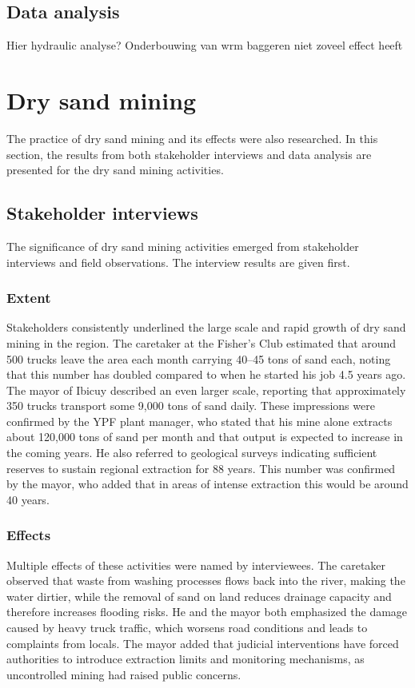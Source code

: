 \subsection{Data analysis}
Hier hydraulic analyse?
Onderbouwing van wrm baggeren niet zoveel effect heeft

\section{Dry sand mining}
The practice of dry sand mining and its effects were also researched. In this section, the results from both stakeholder interviews and data analysis are presented for the dry sand mining activities. 
\subsection{Stakeholder interviews}
The significance of dry sand mining activities emerged from stakeholder interviews and field observations. The interview results are given first.
\subsubsection{Extent}
Stakeholders consistently underlined the large scale and rapid growth of dry sand mining in the region. The caretaker at the Fisher’s Club estimated that around 500 trucks leave the area each month carrying 40–45 tons of sand each, noting that this number has doubled compared to when he started his job 4.5 years ago. The mayor of Ibicuy described an even larger scale, reporting that approximately 350 trucks transport some 9,000 tons of sand daily. These impressions were confirmed by the YPF plant manager, who stated that his mine alone extracts about 120,000 tons of sand per month and that output is expected to increase in the coming years. He also referred to geological surveys indicating sufficient reserves to sustain regional extraction for 88 years. This number was confirmed by the mayor, who added that in areas of intense extraction this would be around 40 years.

\subsubsection{Effects}
Multiple effects of these activities were named by interviewees. The caretaker observed that waste from washing processes flows back into the river, making the water dirtier, while the removal of sand on land reduces drainage capacity and therefore increases flooding risks. He and the mayor both emphasized the damage caused by heavy truck traffic, which worsens road conditions and leads to complaints from locals. The mayor added that judicial interventions have forced authorities to introduce extraction limits and monitoring mechanisms, as uncontrolled mining had raised public concerns.

